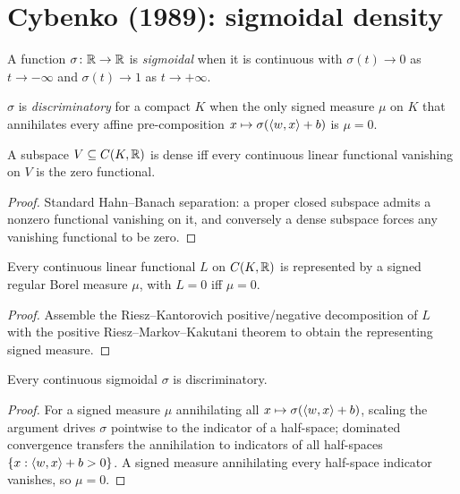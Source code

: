 \chapter{Cybenko (1989): sigmoidal density}

\begin{definition}\label{def:sigmoidal}
  \leanok
  A function $\sigma\colon\mathbb{R}\to\mathbb{R}$ is \emph{sigmoidal} when it is continuous with
  $\sigma(t)\to 0$ as $t\to-\infty$ and $\sigma(t)\to 1$ as $t\to+\infty$.
\end{definition}

\begin{definition}[Discriminatory]\label{def:discriminatory}
  \leanok
  $\sigma$ is \emph{discriminatory} for a compact $K$ when the only signed measure $\mu$ on $K$
  that annihilates every affine pre-composition $x\mapsto\sigma(\left\langle w, x \right\rangle+b)$ is $\mu=0$.
\end{definition}

\begin{theorem}\label{thm:dense-functional}
  \leanok
  A subspace $V\subseteq C(K,\mathbb{R})$ is dense iff every continuous linear functional vanishing on $V$ is
  the zero functional.
\end{theorem}
\begin{proof}\leanok
  Standard Hahn--Banach separation: a proper closed subspace admits a nonzero functional
  vanishing on it, and conversely a dense subspace forces any vanishing functional to be zero.
\end{proof}

\begin{theorem}\label{thm:riesz-repr}
  \leanok
  Every continuous linear functional $L$ on $C(K,\mathbb{R})$ is represented by a signed regular Borel
  measure $\mu$, with $L=0$ iff $\mu=0$.
\end{theorem}
\begin{proof}\leanok
  Assemble the Riesz--Kantorovich positive/negative decomposition of $L$ with the positive
  Riesz--Markov--Kakutani theorem to obtain the representing signed measure.
\end{proof}

\begin{theorem}\label{thm:sigmoidal-discriminatory}
  \leanok
  Every continuous sigmoidal $\sigma$ is discriminatory.
\end{theorem}
\begin{proof}\leanok
  For a signed measure $\mu$ annihilating all $x\mapsto\sigma(\left\langle w, x \right\rangle+b)$, scaling the argument
  drives $\sigma$ pointwise to the indicator of a half-space; dominated convergence transfers the
  annihilation to indicators of all half-spaces $\{x:\left\langle w, x \right\rangle+b>0\}$. A signed measure
  annihilating every half-space indicator vanishes, so $\mu=0$.
\end{proof}

